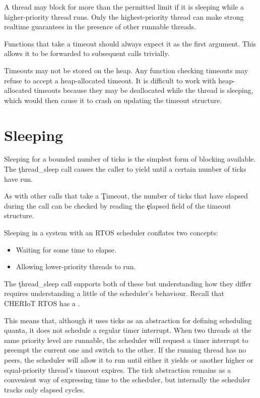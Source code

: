 \begin{note}
A thread may block for more than the permitted limit if it is sleeping while a higher-priority thread runs.
Only the highest-priority thread can make strong realtime guarantees in the presence of other runnable threads.
\end{note}

Functions that take a timeout should always expect it as the first argument.
This allows it to be forwarded to subsequent calls trivially.

\begin{warning}
Timeouts may not be stored on the heap.
Any function checking timeouts may refuse to accept a heap-allocated timeout.
It is difficult to work with heap-allocated timeouts because they may be deallocated while the thread is sleeping, which would then cause it to crash on updating the timeout structure.
\end{warning}

\section{Sleeping}

Sleeping for a bounded number of ticks is the simplest form of blocking available.
The \c{thread_sleep} call causes the caller to yield until a certain number of ticks have run.


As with other calls that take a \c{Timeout}, the number of ticks that have elapsed during the call can be checked by reading the \c{elapsed} field of the timeout structure.

Sleeping in a system with an RTOS scheduler conflates two concepts:

\begin{itemize}
	\item{Waiting for some time to elapse.}
	\item{Allowing lower-priority threads to run.}
\end{itemize}

The \c{thread_sleep} call supports both of these but understanding how they differ requires understanding a little of the scheduler's behaviour.
Recall that CHERIoT RTOS has a .

This means that, although it uses ticks as an abstraction for defining scheduling quanta, it does not schedule a regular timer interrupt.
When two threads at the same priority level are runnable, the scheduler will request a timer interrupt to preempt the current one and switch to the other.
If the running thread has no peers, the scheduler will allow it to run until either it yields or another higher or equal-priority thread's timeout expires.
The tick abstraction remains as a convenient way of expressing time to the scheduler, but internally the scheduler tracks only elapsed cycles.


